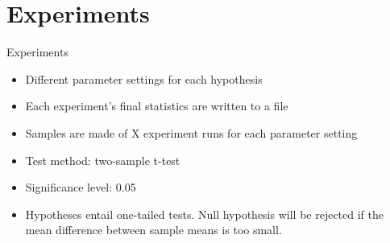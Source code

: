 \section{Experiments}

\begin{frame}{Experiments}
    \begin{itemize}
        \item Different parameter settings for each hypothesis
        \item Each experiment's final statistics are written to a file
        \item Samples are made of X experiment runs for each parameter setting
        \item Test method: two-sample t-test %
        \item Significance level: 0.05
        \item Hypotheses entail one-tailed tests. Null hypothesis will be rejected if the mean difference between sample means is too small.
    \end{itemize}
\end{frame}

